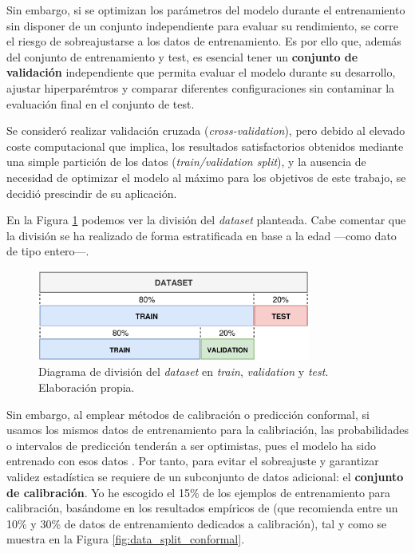 Sin embargo, si se optimizan los parámetros del modelo durante el entrenamiento sin disponer de un conjunto 
independiente para evaluar su rendimiento, se corre el riesgo de sobreajustarse a los datos de entrenamiento.
Es por ello que, además del conjunto de entrenamiento y test, es esencial tener un \textbf{conjunto de 
validación} independiente que permita evaluar el modelo durante su desarrollo, ajustar hiperparémtros y 
comparar diferentes configuraciones sin contaminar la evaluación final en el conjunto de test.

Se consideró realizar validación cruzada (\textit{cross-validation}), pero debido al elevado coste 
computacional que implica, los resultados satisfactorios obtenidos mediante una simple partición de los datos 
(\textit{train/validation split}), y la ausencia de necesidad de optimizar el modelo al máximo para los 
objetivos de este trabajo, se decidió prescindir de su aplicación.

En la Figura \ref{fig:data_split_base} podemos ver la división del \textit{dataset} planteada. Cabe comentar
que la división se ha realizado de forma estratificada en base a la edad ---como dato de tipo entero---.

\begin{figure}[h]
    \centering
    \includegraphics[width=0.8\textwidth]{capitulos/cap_04/imagenes/data_split_base.png}
    \caption[
        Diagrama de división del \textit{dataset} en \textit{train}, \textit{validation} y \textit{test}.
    ]{
        Diagrama de división del \textit{dataset} en \textit{train}, \textit{validation} y \textit{test}. 
        Elaboración propia.
    } 
    \label{fig:data_split_base}
\end{figure}

Sin embargo, al emplear métodos de calibración o predicción conformal, si usamos los mismos datos de 
entrenamiento para la calibriación, 
las probabilidades o intervalos de predicción tenderán a ser optimistas, pues el modelo ha sido entrenado
con esos datos \cite{niculescu2005}. Por tanto, para evitar el sobreajuste y garantizar validez estadística 
se requiere de un subconjunto de datos adicional: el \textbf{conjunto de calibración}. Yo he escogido el 
15\% de los ejemplos de entrenamiento para calibración, basándome en los resultados empíricos de 
\cite{sesia2020} (que recomienda entre un 10\% y 30\% de datos de entrenamiento dedicados a calibración), 
tal y como se muestra en la Figura \ref{fig:data_split_conformal}.

